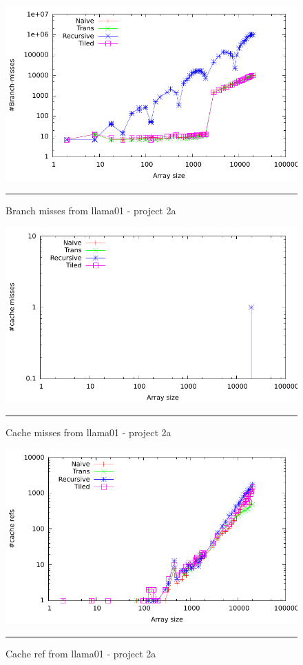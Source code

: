 \begin{figure}[ht]
	\centering
		\includegraphics[width=\textwidth]{./Appendices/Figures/Project2a/Branch_misses_putty.pdf}
		\rule{35em}{0.5pt}
	\caption[Branch misses]{
	Branch misses from llama01 - project 2a
	}
	\label{fig:Branch_misses_p2putty}
\end{figure}
\begin{figure}[ht]
	\centering
		\includegraphics[width=\textwidth]{./Appendices/Figures/Project2a/Cache_misses_putty.pdf}
		\rule{35em}{0.5pt}
	\caption[Cache misses]{
	Cache misses from llama01 - project 2a
	}
	\label{fig:Cache_misses_p2putty}
\end{figure}
\begin{figure}[ht]
	\centering
		\includegraphics[width=\textwidth]{./Appendices/Figures/Project2a/Cache_refs_putty.pdf}
		\rule{35em}{0.5pt}
	\caption[Cache refs]{
	Cache ref from llama01 - project 2a
	}
	\label{fig:Cache_refs_p2putty}
\end{figure}
